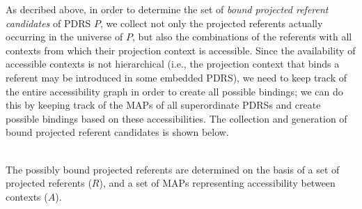 As decribed above, in order to determine the set of \textit{bound projected
referent candidates} of PDRS $P$, we collect not only the projected
referents actually occurring in the universe of $P$, but also the
combinations of the referents with all contexts from which their projection
context is accessible. Since the availability of accessible contexts is not
hierarchical (i.e., the projection context that binds a referent may be
introduced in some embedded PDRS), we need to keep track of the entire
accessibility graph in order to create all possible bindings; we can do this
by keeping track of the MAPs of all superordinate PDRSs and create possible
bindings based on these accessibilities. The collection and generation of
bound projected referent candidates is shown below. 

\begin{subdefinition}\label{def:bprcs}~\\
  The possibly bound projected referents are determined on the basis of a
  set of projected referents ($R$), and a set of MAPs representing
  accessibility between contexts ($A$).
\end{subdefinition}
